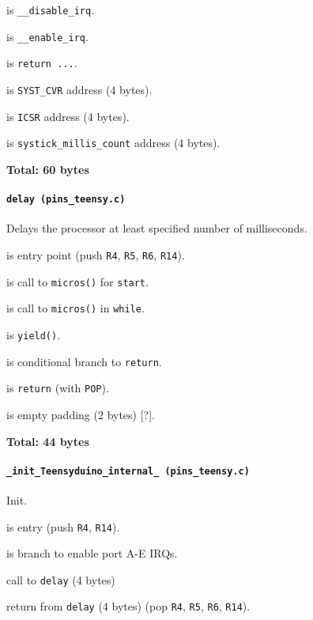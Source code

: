  is \texttt{\_\_disable\_irq}.

 is \texttt{\_\_enable\_irq}.

 is \texttt{return ...}.

\vspace{1em}

 is \texttt{SYST\_CVR} address (4 bytes).

 is \texttt{ICSR} address (4 bytes).

 is \texttt{systick\_millis\_count} address (4 bytes).

\textbf{Total: 60 bytes}

\paragraph{\texttt{delay (pins\_teensy.c)}} Delays the processor at least
specified number of milliseconds.

 is entry point (push \texttt{R4}, \texttt{R5},
\texttt{R6}, \texttt{R14}).

 is call to \texttt{micros()} for \texttt{start}.

 is call to \texttt{micros()} in \texttt{while}.

 is \texttt{yield()}.

 is conditional branch to \texttt{return}.

 is \texttt{return} (with \texttt{POP}).

 is empty padding (2 bytes) [?].

\textbf{Total: 44 bytes}

\paragraph{\texttt{\_init\_Teensyduino\_internal\_ (pins\_teensy.c)}}
Init.

 is entry (push \texttt{R4}, \texttt{R14}).

 is branch to enable port A-E IRQs.

 call to \texttt{delay} (4 bytes)

 return from \texttt{delay} (4 bytes) (pop \texttt{R4},
\texttt{R5}, \texttt{R6}, \texttt{R14}).

